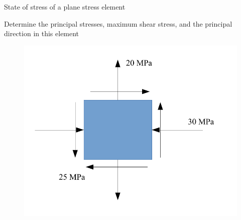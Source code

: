 \documentclass[
10pt,
a4paper,
openany,
svgnames,
]{book} %
\begin{document}
\begin{example} State of stress of a plane stress element \label{example: plane stress}
  
  Determine the principal stresses, maximum shear stress, and the principal direction in this element 

  \begin{figure}[H]
    \centering
    \includegraphics[scale=0.5]{pictures/Static-body-load-analysis/plane-stress-example}
    \caption[]{}
  \end{figure}
\end{example}
\end{document}
